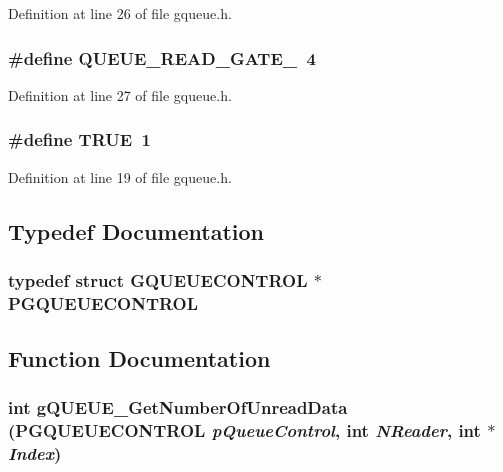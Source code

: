 Definition at line 26 of file gqueue.h.
\subsubsection[{QUEUE\_\-READ\_\-GATE\_\-4}]{\setlength{\rightskip}{0pt plus 5cm}\#define QUEUE\_\-READ\_\-GATE\_~4}\label{gqueue_8h_a4771f3ff5f05b3a182aae96aed1e4509}


Definition at line 27 of file gqueue.h.
\subsubsection[{TRUE}]{\setlength{\rightskip}{0pt plus 5cm}\#define TRUE~1}\label{gqueue_8h_aa8cecfc5c5c054d2875c03e77b7be15d}


Definition at line 19 of file gqueue.h.

\subsection{Typedef Documentation}
\subsubsection[{PGQUEUECONTROL}]{\setlength{\rightskip}{0pt plus 5cm}typedef  struct {\bf GQUEUECONTROL} $\ast$ {\bf PGQUEUECONTROL}}\label{gqueue_8h_ae87815147ae3a01555f1b9cb639d236a}


\subsection{Function Documentation}
\subsubsection[{gQUEUE\_\-GetNumberOfUnreadData}]{\setlength{\rightskip}{0pt plus 5cm}int gQUEUE\_\-GetNumberOfUnreadData ({\bf PGQUEUECONTROL} {\em pQueueControl}, \/  int {\em NReader}, \/  int $\ast$ {\em Index})}\label{gqueue_8h_a7138af0e73adef329c891210ba747a2e}


